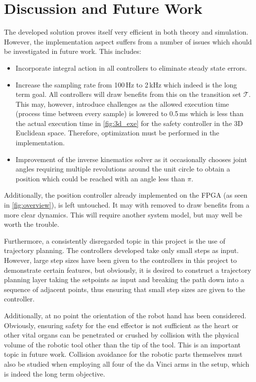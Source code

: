 \section*{Discussion and Future Work}
The developed solution proves itself very efficient in both theory and simulation. However, the implementation aspect suffers from a number of issues which should be investigated in future work. This includes:
\begin{itemize}
\item Incorporate integral action in all controllers to eliminate steady state errors.
\item Increase the sampling rate from 100\,Hz to 2\,kHz which indeed is the long term goal. All controllers will draw benefits from this on the transition set $\mathcal{T}$. This may, however, introduce challenges as the allowed execution time (process time between every sample) is lowered to 0.5\,ms which is less than the actual execution time in \autoref{fig:3d_exe} for the safety controller in the 3D Euclidean space. Therefore, optimization must be performed in the implementation.
\item Improvement of the inverse kinematics solver as it occasionally chooses joint angles requiring multiple revolutions around the unit circle to obtain a position which could be reached with an angle less than $\pi$.
\end{itemize}
Additionally, the position controller already implemented on the FPGA (as seen in \autoref{fig:overview}), is left untouched. It may with removed to draw benefits from a more clear dynamics. This will require another system model, but may well be worth the trouble.

Furthermore, a consistently disregarded topic in this project is the use of trajectory planning. The controllers developed take only small steps as input. However, large step sizes have been given to the controllers in this project to demonstrate certain features, but obviously, it is desired to construct a trajectory planning layer taking the setpoints as input and breaking the path down into a sequence of adjacent points, thus ensuring that small step sizes are given to the controller.

Additionally, at no point  the orientation of the robot hand has been considered. Obviously, ensuring safety for the end effector is not sufficient as the heart or other vital organs can be penetrated or crushed by collision with the physical volume of the robotic tool other than the tip of the tool. This is an important topic in future work. Collision avoidance for the robotic parts themselves must also be studied when employing all four of the da Vinci arms in the setup, which is indeed the long term objective.

